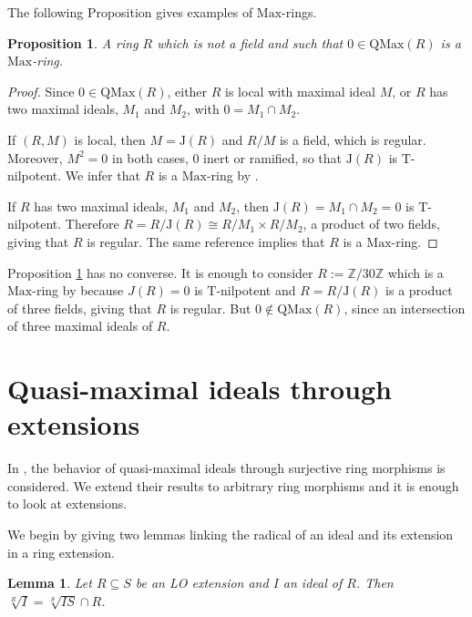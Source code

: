 \documentclass[12pt,leqno]{amsart}
\newtheorem{lemma}[theorem]{Lemma}
\newtheorem{proposition}[theorem]{Proposition}
\theoremstyle{definition}
\begin{document}
The following Proposition gives examples of $\mathrm{Max}$-rings.

\begin{proposition} \label{2.17} A ring $R$ which is not a field and such that $0\in\mathrm {QMax}(R)$ is a $\mathrm{Max}$-ring. 
\end{proposition}
\begin{proof} Since $0\in\mathrm{QMax}(R)$, either $R$ is local with maximal ideal $M$, or $R$ has two maximal ideals, $M_1$ and $M_2$, with $0= M_1 \cap M_2$. 

If $(R,M)$ is local, then $M=\mathrm J(R)$ and $R/M$ is a field, which is  regular. Moreover, $M^2=0$ in both cases, $0$ inert or ramified, so that $\mathrm J(R)$ is $\mathrm T$-nilpotent. We infer that $R$ is a $\mathrm {Max}$-ring by \cite[Theorem, p.1135]{Ham}.

If $R$ has two maximal ideals, $M_1$ and $M_2$, then $\mathrm J(R)= M_1\cap M_2=0$ is $\mathrm T$-nilpotent. Therefore $R=R/\mathrm J(R)\cong R/M_1\times R/M_2$, a product of two fields, giving that $R$ is regular. The same reference implies that $R$ is a $\mathrm {Max}$-ring. 
\end{proof} 

Proposition \ref{2.17} has no converse. It is enough to consider $R:=\mathbb Z/30\mathbb Z$ which is a $\mathrm {Max}$-ring by \cite[Theorem, p.1135]{Ham} because $J(R)=0$ is $\mathrm T$-nilpotent and $R=R/\mathrm J(R)$ is a product of three fields, giving that $R$ is regular. But $0\not\in\mathrm{QMax}(R)$, since an intersection of three maximal ideals of $R$.

\section{Quasi-maximal ideals through extensions}
  
In \cite[Proposition 2]{AKKT}, the behavior of quasi-maximal ideals through surjective ring morphisms is considered. We extend their results to arbitrary ring morphisms and  it is enough to look at  extensions. 

We begin by giving two lemmas linking the radical of an ideal and its extension in a ring extension. 

\begin{lemma}\label{3.25}Let $R\subseteq S$ be an LO extension and $I$ an ideal of $R$. Then   $\sqrt[R]I=\sqrt[S]{IS}\cap R$.
\end{lemma}
\end{document}
